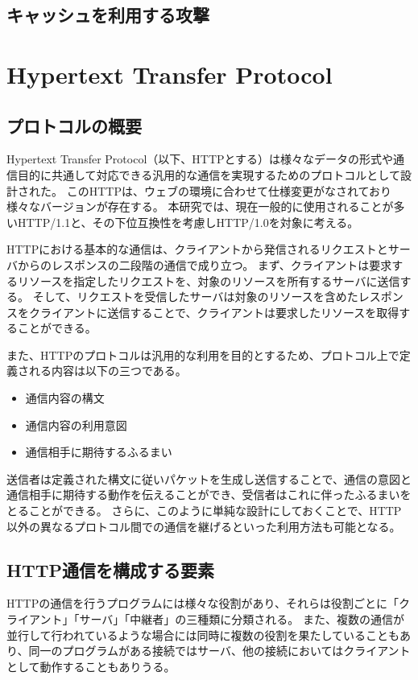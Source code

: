\documentclass[12pt,a4paper]{jbook}
\begin{document}
\subsection{キャッシュを利用する攻撃}

\section{Hypertext Transfer Protocol}
\subsection{プロトコルの概要}
Hypertext Transfer Protocol（以下、HTTPとする）は様々なデータの形式や通信目的に共通して対応できる汎用的な通信を実現するためのプロトコルとして設計された。
このHTTPは、ウェブの環境に合わせて仕様変更がなされており様々なバージョンが存在する。
本研究では、現在一般的に使用されることが多いHTTP/1.1\cite{rfc7230,rfc7231,rfc7232,rfc7233,rfc7234,rfc7235}と、その下位互換性を考慮しHTTP/1.0\cite{rfc1945}を対象に考える。

HTTPにおける基本的な通信は、クライアントから発信されるリクエストとサーバからのレスポンスの二段階の通信で成り立つ。
まず、クライアントは要求するリソースを指定したリクエストを、対象のリソースを所有するサーバに送信する。
そして、リクエストを受信したサーバは対象のリソースを含めたレスポンスをクライアントに送信することで、クライアントは要求したリソースを取得することができる。

また、HTTPのプロトコルは汎用的な利用を目的とするため、プロトコル上で定義される内容は以下の三つである。
\begin{itemize}
\item 通信内容の構文
\item 通信内容の利用意図
\item 通信相手に期待するふるまい
\end{itemize}
送信者は定義された構文に従いパケットを生成し送信することで、通信の意図と通信相手に期待する動作を伝えることができ、受信者はこれに伴ったふるまいをとることができる。
さらに、このように単純な設計にしておくことで、HTTP以外の異なるプロトコル間での通信を継げるといった利用方法も可能となる。

\subsection{HTTP通信を構成する要素}
HTTPの通信を行うプログラムには様々な役割があり、それらは役割ごとに「クライアント」「サーバ」「中継者」の三種類に分類される。
また、複数の通信が並行して行われているような場合には同時に複数の役割を果たしていることもあり、同一のプログラムがある接続ではサーバ、他の接続においてはクライアントとして動作することもありうる。
\end{document}
